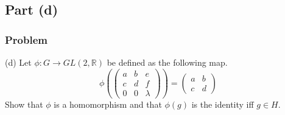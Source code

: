 \subsection{Part (d)}
\subsubsection{Problem}
(d) Let $\phi: G \to GL(2,\mathbb{R})$ be defined as the following map.
$$
\phi\left(\begin{pmatrix} a & b & e \\ c & d & f \\ 0 & 0 & \lambda \end{pmatrix}\right) = \begin{pmatrix} a& b \\ c & d\end{pmatrix}
$$
Show that $\phi$ is a homomorphism and that $\phi(g)$ is the identity iff $g \in H$.
